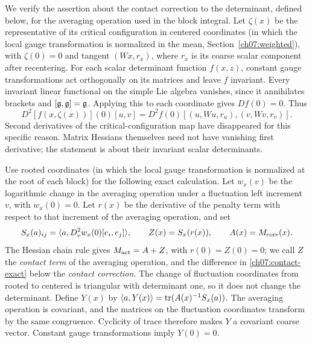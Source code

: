 We verify the assertion about the contact correction to the determinant, defined below, for the averaging operation used in the
block integral. Let $\zeta(x)$ be the representative of its critical configuration in centered
coordinates (in which the local gauge transformation is normalized in the mean, Section~\ref{ch07:weighted}), with $\zeta(0)=0$ and tangent $(Wx,r_x)$, where $r_x$ is its
coarse scalar component after recentering.
%
For each scalar determinant function $f(x,z)$, constant gauge transformations
act orthogonally on its matrices and leave $f$ invariant. Every invariant
linear functional on the simple Lie algebra vanishes, since it annihilates
brackets and $[\mathfrak g,\mathfrak g]=\mathfrak g$. Applying this to each coordinate gives
$Df(0)=0$. Thus
\begin{equation}\label{ch07:tangent-chain}
 D^2[f(x,\zeta(x))](0)[u,v]
   =D^2f(0)[(u,Wu,r_u),(v,Wv,r_v)].
\end{equation}
Second derivatives of the critical-configuration map have disappeared for this
specific reason. Matrix Hessians themselves need not have vanishing first
derivative; the statement is about their invariant scalar determinants.

Use rooted coordinates (in which the local gauge transformation is normalized at the root of each block) for the following exact calculation. Let $w_x(v)$
be the logarithmic change in the averaging operation under a fluctuation left increment
$v$, with $w_x(0)=0$. Let $r(x)$ be the derivative of the penalty term
with respect to that increment of the averaging operation, and set
\[
 S_x(a)_{ij}=\langle a,D_v^2w_x(0)[e_i,e_j]\rangle,
 \qquad Z(x)=S_x(r(x)),\qquad A(x)=M_{\rm core}(x).
\]
The Hessian chain rule gives $M_{\rm act}=A+Z$, with $r(0)=Z(0)=0$; we call $Z$ the \emph{contact term} of the averaging operation, and the difference in \eqref{ch07:contact-exact} below the \emph{contact correction}.
The change of fluctuation coordinates from rooted to centered is triangular with determinant one,
so it does not change the determinant. Define $Y(x)$ by
$\langle a,Y(x)\rangle=\operatorname{tr}(A(x)^{-1}S_x(a))$.
The averaging operation is covariant, and the matrices on the fluctuation coordinates transform by the
same congruence. Cyclicity of trace therefore makes $Y$ a covariant
coarse vector. Constant gauge transformations imply $Y(0)=0$.

